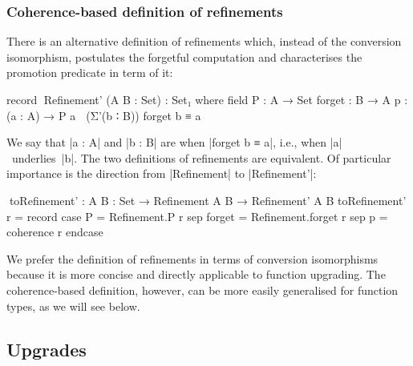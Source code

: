 
\subsubsection{Coherence-based definition of refinements}

There is an alternative definition of refinements which, instead of the conversion isomorphism, postulates the forgetful computation and characterises the promotion predicate in term of it:
\begin{code}
record ^^^Refinement' (A B : Set) : Set₁ where
  field
    P       :  A → Set
    forget  :  B → A
    p       :  (a : A) → P a ≅ (Σ'(b ∶ B)) forget b ≡ a
\end{code}
We say that |a : A| and |b : B| are  when |forget b ≡ a|, i.e., when |a|~underlies~|b|.
The two definitions of refinements are equivalent.
Of particular importance is the direction from |Refinement| to |Refinement'|:
\begin{code}
^^^toRefinement' : {A B : Set} → Refinement A B → Refinement' A B
toRefinement' r = record  case  P       =  Refinement.P r
                          sep   forget  =  Refinement.forget r
                          sep   p       =  coherence r endcase
\end{code}
We prefer the definition of refinements in terms of conversion isomorphisms because it is more concise and directly applicable to function upgrading.
The coherence-based definition, however, can be more easily generalised for function types, as we will see below.

\subsection{Upgrades}
\label{sec:upgrades}

